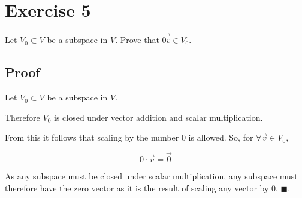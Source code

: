 \section*{Exercise 5}

Let $V_0 \subset V$ be a subspace in $V$. Prove that $\vec{0v} \in V_0$.

\subsection*{Proof}

Let $V_0 \subset V$ be a subspace in $V$.

Therefore $V_0$ is closed under vector addition and scalar multiplication.

From this it follows that scaling by the number 0 is allowed. So, for $ \forall \vec{v} \in V_0$,

\[0 \cdot \vec{v} = \vec{0}\]

As any subspace must be closed under scalar multiplication, any subspace must therefore have the zero vector as it is the result of scaling any vector by 0. $\blacksquare$.
